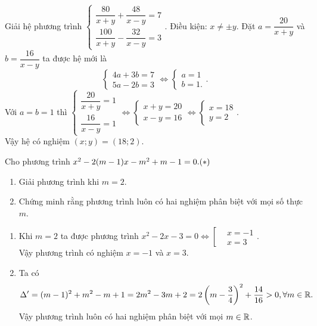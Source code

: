 \begin{ex}%
	Giải hệ phương trình $\begin{cases}
							\dfrac{80}{x+y}+\dfrac{48}{x-y}=7 \\
							\dfrac{100}{x+y}-\dfrac{32}{x-y}=3
						 \end{cases}$.
	\loigiai
	{Điều kiện: $x \ne \pm y$. Đặt $a= \dfrac{20}{x+y}$ và $b=\dfrac{16}{x-y}$ ta được hệ mới là
	$$\begin{cases}
		4a + 3b = 7\\
		5a - 2b =  3
	\end{cases} 
	\Leftrightarrow 
	\begin{cases}
		a = 1\\
		b =  1.
	\end{cases}.
	$$
	Với $a=b=1$ thì 
	$\begin{cases}
		\dfrac{20}{x+y}=1\\
		\dfrac{16}{x-y}=1
	\end{cases}\Leftrightarrow
	\begin{cases}
		x+y=20\\
		x-y=16
	\end{cases} \Leftrightarrow
	\begin{cases}
		x=18\\
		y=2
	\end{cases}$.\\
	Vậy hệ có nghiệm $(x;y)=(18;2)$.
	}
\end{ex}

\begin{ex}%
Cho phương trình $x^2-2(m-1)x-m^2+m-1=0. \hfill (*)$
	\begin{enumerate}
		\item Giải phương trình khi $m=2$.
		\item Chứng minh rằng phương trình luôn có hai nghiệm phân biệt với mọi số thực $m$.
	\end{enumerate}
	\loigiai
	{\begin{enumerate}
	\item Khi $m=2$ ta được phương trình $x^2-2x-3=0 \Leftrightarrow \left[\begin{aligned} & x=-1 \\ & x=3\end{aligned}\right.$.\\
	Vậy phương trình có nghiệm $x=-1$ và $x=3$.
	\item Ta có 
			$$\Delta'=(m-1)^2+m^2 -m +1= 2m^2-3m+2 = 2\left( m-\dfrac{3}{4}\right)^2 +\dfrac{14}{16}>0, \forall m \in \Bbb R.$$
	Vậy phương trình luôn có hai nghiệm phân biệt với mọi $m\in \Bbb R$.
		\end{enumerate}
	}
\end{ex}



